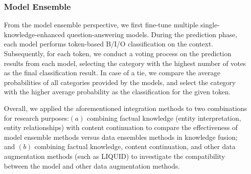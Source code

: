 \subsubsection{Model Ensemble}
\label{sec:model_ensemble}
 From the model ensemble perspective, we first fine-tune multiple single-knowledge-enhanced question-answering models. During the prediction phase, each model performs token-based B/I/O classification on the context. Subsequently, for each token, we conduct a voting process on the prediction results from each model, selecting the category with the highest number of votes as the final classification result. In case of a tie, we compare the average probabilities of all categories provided by the models, and select the category with the higher average probability as the classification for the given token.
 
 Overall, we applied the aforementioned integration methods to two combinations for research purposes:$(a)$ combining factual knowledge (entity interpretation, entity relationships) with content continuation to compare the effectiveness of model ensemble methods versus data ensembles methods in knowledge fusion; and $(b)$ combining factual knowledge, content continuation, and other data augmentation methods (such as LIQUID) to investigate the compatibility between the model and other data augmentation methods.
 



